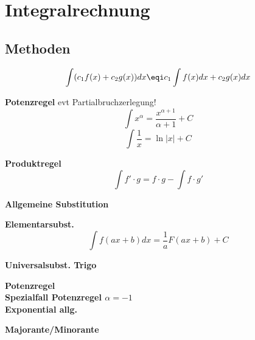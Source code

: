\section{Integralrechnung}
\subsection{Methoden}
\[
\int(c_1f(x) + c_2g(x))dx \eqi c_1 \int f(x)dx + c_2 g(x) dx
\]

\textbf{Potenzregel} evt Partialbruchzerlegung!
\[
\int x^\alpha = \frac{x^{\alpha  + 1}}{\alpha + 1} + C
\]
\[
\int \frac{1}{x} = \ln\left|x\right| + C
\]

\textbf{Produktregel}
\[
\int f' \cdot g = f \cdot g - \int f \cdot g'
\]

\textbf{Allgemeine Substitution}

\textbf{Elementarsubst.}
\[
\int f(ax + b)dx = \frac{1}{a}F(ax+b)+C
\]

\textbf{Universalsubst. Trigo}\\


\textbf{Potenzregel}\\
\textbf{Spezialfall Potenzregel $\alpha = -1$}\\
\textbf{Exponential allg.}\\

\textbf{Majorante/Minorante}
